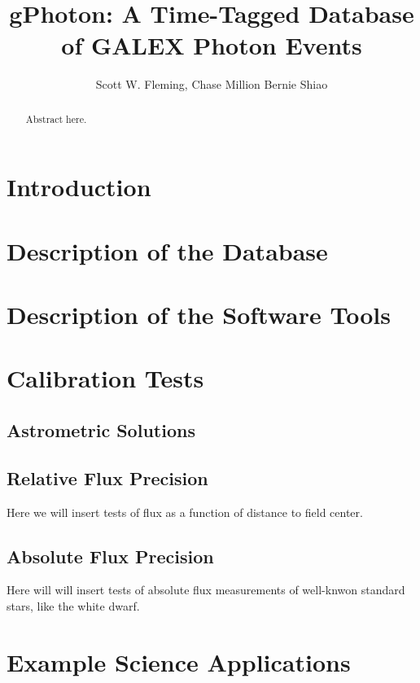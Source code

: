 \documentclass[preprint]{aastex}
\begin{document}
\title{gPhoton: A Time-Tagged Database of GALEX Photon Events}

\author{Scott W. Fleming,
Chase Million
Bernie Shiao}



\begin{abstract}
Abstract here.
\end{abstract}

\section{Introduction}

\section{Description of the Database}

\section{Description of the Software Tools}

\section{Calibration Tests}

\subsection{Astrometric Solutions}

\subsection{Relative Flux Precision}
Here we will insert tests of flux as a function of distance to field center.

\subsection{Absolute Flux Precision}
Here will will insert tests of absolute flux measurements of well-knwon standard stars, like the white dwarf.

\section{Example Science Applications}
\end{document}
